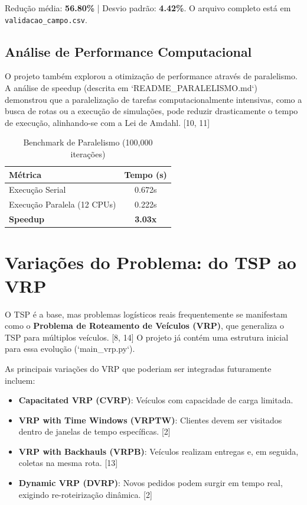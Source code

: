 \documentclass[11pt,a4paper,twocolumn]{article}
\begin{document}
Redução média: \textbf{56.80\%} | Desvio padrão: \textbf{4.42\%}. O arquivo completo está em \texttt{validacao\_campo.csv}.

\subsection{Análise de Performance Computacional}
O projeto também explorou a otimização de performance através de paralelismo. A análise de speedup (descrita em `README_PARALELISMO.md`) demonstrou que a paralelização de tarefas computacionalmente intensivas, como a busca de rotas ou a execução de simulações, pode reduzir drasticamente o tempo de execução, alinhando-se com a Lei de Amdahl. [10, 11]

\begin{table}[H]
\centering
\caption{Benchmark de Paralelismo (100,000 iterações)}
\begin{tabular}{lc}
\toprule
\textbf{Métrica} & \textbf{Tempo (s)} \\
\midrule
Execução Serial & 0.672s \\
Execução Paralela (12 CPUs) & 0.222s \\
\textbf{Speedup} & \textbf{3.03x} \\
\bottomrule
\end{tabular}
\end{table}

\section{Variações do Problema: do TSP ao VRP}

O TSP é a base, mas problemas logísticos reais frequentemente se manifestam como o \textbf{Problema de Roteamento de Veículos (VRP)}, que generaliza o TSP para múltiplos veículos. [8, 14] O projeto já contém uma estrutura inicial para essa evolução (`main_vrp.py`).

As principais variações do VRP que poderiam ser integradas futuramente incluem:
\begin{itemize}
    \item \textbf{Capacitated VRP (CVRP)}: Veículos com capacidade de carga limitada.
    \item \textbf{VRP with Time Windows (VRPTW)}: Clientes devem ser visitados dentro de janelas de tempo específicas. [2]
    \item \textbf{VRP with Backhauls (VRPB)}: Veículos realizam entregas e, em seguida, coletas na mesma rota. [13]
    \item \textbf{Dynamic VRP (DVRP)}: Novos pedidos podem surgir em tempo real, exigindo re-roteirização dinâmica. [2]
\end{itemize}
\end{document}
